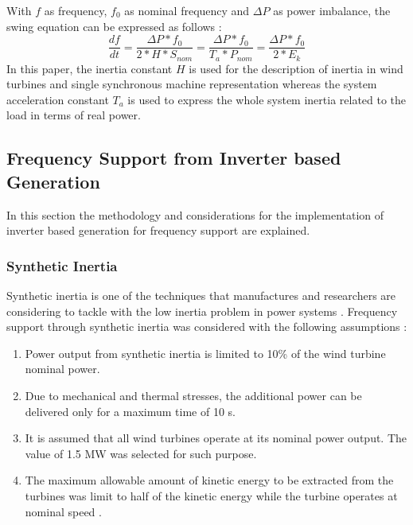 With $f$ as frequency, $f_0$ as nominal frequency and $\Delta P$ as power imbalance, the swing equation can be expressed as follows \cite{kundur1994power}:
\begin{equation}
	\label{eq:swing}
	\frac{df}{dt}=\dfrac{\Delta P*f_0}{2*H*S_{nom}}=\frac{\Delta P*f_0}{T_a*P_{nom}}=\frac{\Delta P*f_0}{2*E_k}
\end{equation}
In this paper, the inertia constant $ H $ is used for the description of inertia in wind turbines and single synchronous machine representation whereas the system acceleration constant $ T_a $ is used to express the whole system inertia related to the load in terms of real power.

\subsection{Frequency Support from Inverter based Generation}

In this section the methodology and considerations for the implementation of inverter based generation for frequency support are explained.
 
\subsubsection{Synthetic Inertia}

Synthetic inertia is one of the techniques that manufactures and researchers are considering to tackle with the low inertia problem in power systems \cite{Gevorgian.2017, GeneralElectricInternational.2013}. Frequency support through synthetic inertia was considered with the following assumptions \cite{dreidy2017inertia, nesje2015need}:
\begin{enumerate}[leftmargin=*,labelsep=4.9mm]
	\item Power output from synthetic inertia is limited to 10\% of the wind turbine nominal power.
	\item Due to mechanical and thermal stresses, the additional power can be delivered only for a maximum time of 10 s.
	\item It is assumed that all wind turbines operate at its nominal power output. The value of 1.5 MW was selected for such purpose.
	\item The maximum allowable amount of kinetic energy to be extracted from the turbines was limit to half of the kinetic energy while the turbine operates at nominal speed \cite{NREL.2012}.

\end{enumerate}

